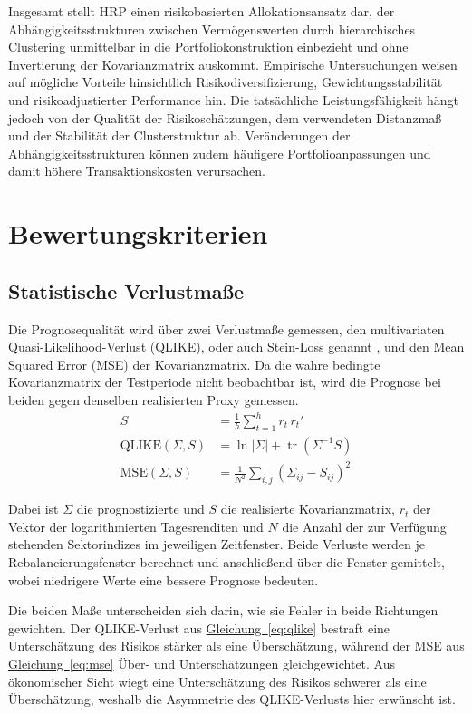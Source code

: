 \documentclass[a4paper, 12pt]{article}
\begin{document}
Insgesamt stellt HRP einen risikobasierten Allokationsansatz dar, der Abhängigkeitsstrukturen zwischen Vermögenswerten durch hierarchisches Clustering unmittelbar in die Portfoliokonstruktion einbezieht und ohne Invertierung der Kovarianzmatrix auskommt.
Empirische Untersuchungen weisen auf mögliche Vorteile hinsichtlich Risikodiversifizierung, Gewichtungsstabilität und risikoadjustierter Performance hin.
Die tatsächliche Leistungsfähigkeit hängt jedoch von der Qualität der Risikoschätzungen, dem verwendeten Distanzmaß und der Stabilität der Clusterstruktur ab.
Veränderungen der Abhängigkeitsstrukturen können zudem häufigere Portfolioanpassungen und damit höhere Transaktionskosten verursachen.

\section{Bewertungskriterien}\label{sec:kriterien}

\subsection{Statistische Verlustmaße}
Die Prognosequalität wird über zwei Verlustmaße gemessen, den multivariaten Quasi-Likelihood-Verlust (QLIKE), oder auch Stein-Loss genannt \parencite{laurent2013}, und den Mean Squared Error (MSE) der Kovarianzmatrix.
Da die wahre bedingte Kovarianzmatrix der Testperiode nicht beobachtbar ist, wird die Prognose bei beiden gegen denselben realisierten Proxy gemessen.
\begin{align}
	\label{eq:proxy}
	S &= \frac{1}{h}\sum_{t=1}^{h} r_t\,r_t' \\
	\label{eq:qlike}
	\mathrm{QLIKE}(\Sigma, S) &= \ln|\Sigma| + \operatorname{tr}(\Sigma^{-1} S) \\
	\label{eq:mse}
	\mathrm{MSE}(\Sigma, S) &= \frac{1}{N^2}\sum_{i,j}\left(\Sigma_{ij} - S_{ij}\right)^2
\end{align}

Dabei ist $\Sigma$ die prognostizierte und $S$ die realisierte Kovarianzmatrix, $r_t$ der Vektor der logarithmierten Tagesrenditen und $N$ die Anzahl der zur Verfügung stehenden Sektorindizes im jeweiligen Zeitfenster.
Beide Verluste werden je Rebalancierungsfenster berechnet und anschließend über die Fenster gemittelt, wobei niedrigere Werte eine bessere Prognose bedeuten.

Die beiden Maße unterscheiden sich darin, wie sie Fehler in beide Richtungen gewichten.
Der QLIKE-Verlust aus \hyperref[eq:qlike]{Gleichung~\ref*{eq:qlike}} bestraft eine Unterschätzung des Risikos stärker als eine Überschätzung, während der MSE aus \hyperref[eq:mse]{Gleichung~\ref*{eq:mse}} Über- und Unterschätzungen gleichgewichtet.
Aus ökonomischer Sicht wiegt eine Unterschätzung des Risikos schwerer als eine Überschätzung, weshalb die Asymmetrie des QLIKE-Verlusts hier erwünscht ist.
\end{document}
